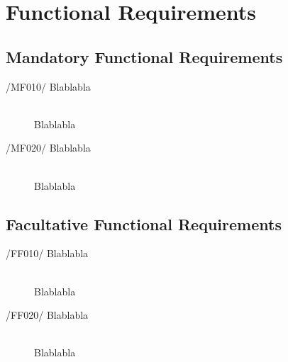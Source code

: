 \section{Functional Requirements}

\subsection{Mandatory Functional Requirements}
\begin{description}
\item[/MF010/ Blablabla]\hfill \\ Blablabla
\item[/MF020/ Blablabla]\hfill \\ Blablabla
\end{description}

\subsection{Facultative Functional Requirements}
\begin{description}
\item[/FF010/ Blablabla]\hfill \\ Blablabla
\item[/FF020/ Blablabla]\hfill \\ Blablabla
\end{description}